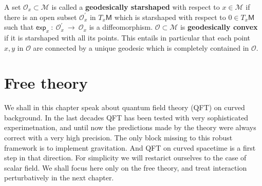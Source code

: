 \documentclass[10pt]{book}
\newcommand{\Mcal}{\mathcal{M}}
\newcommand{\Ocal}{\mathcal{O}}
\newcommand{\Msf}{\mathsf{M}}
\theoremstyle{break}
\newtheorem{definition}{Definition}
\begin{document}



A set $\Ocal_x \subset \Mcal$ is called a \textbf{geodesically starshaped} with respect to $x \in \Mcal$ if there is an open subset $\Ocal^{\prime}_x$ in $T_x\Msf$ which is starshaped with respect to $0 \in T_x\Msf$ such that $\mathsf{exp}_x \ : \ \Ocal^{\prime}_x \ \to \ \Ocal_x$ is a diffeomorphism. 
%
%
$\Ocal \subset \Mcal$ is \textbf{geodesically convex} if it is starshaped with all its points. This entails in particular that each point $x,y$ in $\Ocal$ are connected by a unique geodesic which is completely contained in $\Ocal$.


\chapter{Free theory}


We shall in this chapter speak about quantum field theory (QFT) on curved background. In the last decades QFT has been tested with very sophisticated experimetnation, and until now the predictions made by the theory were always correct with a very high precision. The only block missing to this robust framework is to implement gravitation. And QFT on curved spacetime is a first step in that direction. For simplicity we will restarict ourselves to the case of scalar field. We shall focus here only on the free theory, and treat interaction perturbatively in the next chapter.\par%
\end{document}
